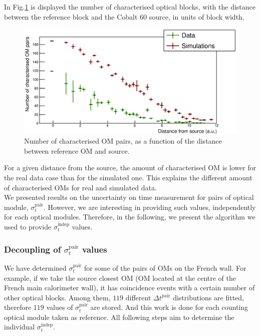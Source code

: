 In Fig.\ref{fig:Co_sigma_distance} is displayed the number of characterised optical blocks, with the distance between the reference block and the Cobalt $60$ source, in units of block width.
\begin{figure}[h]
  \centering
  \includegraphics[width=15cm]{commissioning/fig_commissioning/Co_sigma_distance.eps}
  \caption{Number of characterised OM pairs, as a function of the distance between reference OM and source.
    \label{fig:Co_sigma_distance}}
\end{figure}
For a given distance from the source, the amount of characterised OM is lower for the real data case than for the simulated one.
This explains the different amount of characterised OMs for real and simulated data.\\

We presented results on the uncertainty on time measurement for pairs of optical module, $\sigma_{t}^{\text{pair}}$.
However, we are interesting in providing such values, independently for each optical modules.
Therefore, in the following, we present the algorithm we used to provide $\sigma_{t}^{\text{indep}}$ values.




\subsubsection*{Decoupling of $\sigma_{t}^{\text{pair}}$ values}

We have determined $\sigma_{t}^{\text{pair}}$ for some of the pairs of OMs on the French wall.
For example, if we take the source closest OM (OM located at the centre of the French main calorimeter wall), it has coincidence events with a certain number of other optical blocks.
Among them, $119$ different $\Delta t^{\text{pair}}$ distributions are fitted, therefore $119$ values of $\sigma_{t}^{\text{pair}}$ are stored.
And this work is done for each counting optical module taken as reference.
All following steps aim to determine the individual $\sigma_{t}^{\text{indep}}$.

